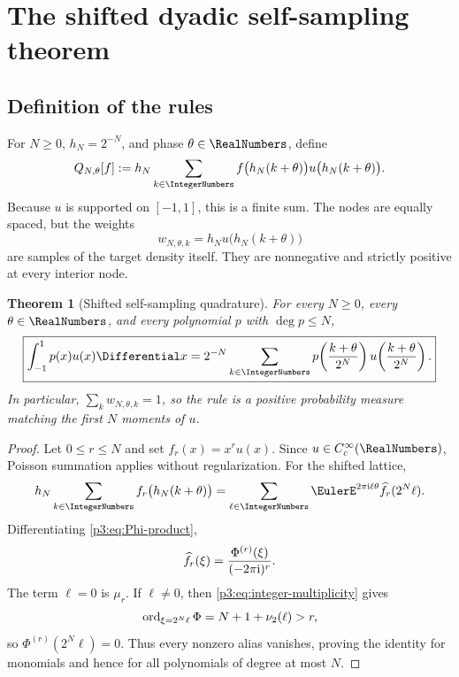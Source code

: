 \documentclass[11pt,oneside]{article}
\numberwithin{equation}{section}
\newtheorem{theorem}{Theorem}[section]
\theoremstyle{definition}
\theoremstyle{remark}
\begin{document}
\section{The shifted dyadic self-sampling theorem}
\label{p3:sec:self-sampling}

\subsection{Definition of the rules}

For $N\ge0$, $h_N=2^{-N}$, and phase $\theta\in\RealNumbers$, define
\begin{equation}
 Q_{N,\theta}[f]
 :=h_N\sum_{k\in\IntegerNumbers}
 f\bigl(h_N(k+\theta)\bigr)
 u\bigl(h_N(k+\theta)\bigr).
 \label{p3:eq:Q-def}
\end{equation}
Because $u$ is supported on $[-1,1]$, this is a finite sum.  The nodes are equally spaced, but the weights
\begin{equation}
 w_{N,\theta,k}=h_Nu\bigl(h_N(k+\theta)\bigr)
 \label{p3:eq:self-weights}
\end{equation}
are samples of the target density itself.  They are nonnegative and strictly positive at every interior node.

\begin{theorem}[Shifted self-sampling quadrature]
\label{p3:thm:self-sampling}
For every $N\ge0$, every $\theta\in\RealNumbers$, and every polynomial $p$ with $\deg p\le N$,
\begin{equation}
 \boxed{\displaystyle
 \int_{-1}^{1}p(x)u(x)\Differential x
 =2^{-N}\sum_{k\in\IntegerNumbers}
 p\!\left(\frac{k+\theta}{2^N}\right)
 u\!\left(\frac{k+\theta}{2^N}\right).}
 \label{p3:eq:self-sampling-main}
\end{equation}
In particular, $\sum_k w_{N,\theta,k}=1$, so the rule is a positive probability measure matching the first $N$ moments of $u$.
\end{theorem}

\begin{proof}
Let $0\le r\le N$ and set $f_r(x)=x^ru(x)$.  Since $u\in C_c^\infty(\RealNumbers)$, Poisson summation applies without regularization.  For the shifted lattice,
\begin{equation}
 h_N\sum_{k\in\IntegerNumbers}f_r\bigl(h_N(k+\theta)\bigr)
 =\sum_{\ell\in\IntegerNumbers}\EulerE^{2\pi\iu\ell\theta}
 \widehat f_r(2^N\ell).
 \label{p3:eq:shifted-Poisson}
\end{equation}
Differentiating \eqref{p3:eq:Phi-product},
\begin{equation}
 \widehat f_r(\xi)=\frac{\Phi^{(r)}(\xi)}{(-2\pi\mathrm i)^r}.
 \label{p3:eq:monomial-transform}
\end{equation}
The term $\ell=0$ is $\mu_r$.  If $\ell\ne0$, then \eqref{p3:eq:integer-multiplicity} gives
\[
 \operatorname{ord}_{\xi=2^N\ell}\Phi
 =N+1+\nu_2(\ell)>r,
\]
so $\Phi^{(r)}(2^N\ell)=0$.  Thus every nonzero alias vanishes, proving the identity for monomials and hence for all polynomials of degree at most $N$.
\end{proof}
\end{document}
